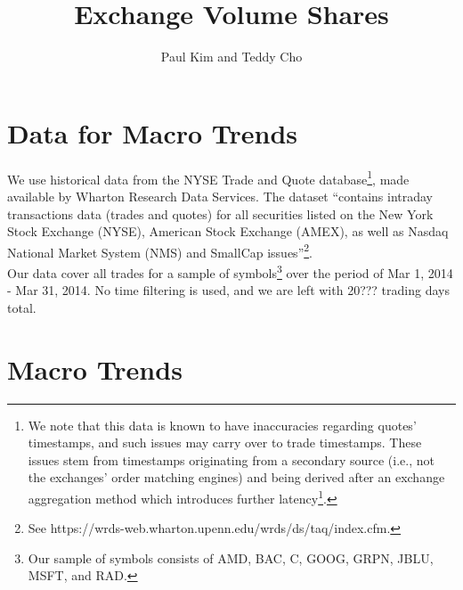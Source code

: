 \documentclass{article}
\begin{document}
\title{Exchange Volume Shares} \author{Paul Kim and Teddy Cho}

\maketitle
\vspace{.5pc}

\section{Data for Macro Trends}
We use historical data from the NYSE Trade and Quote database\footnote{We note that this data is known to have inaccuracies regarding quotes' timestamps, and such issues may carry over to trade timestamps. These issues stem from timestamps originating from a secondary source (i.e., not the exchanges' order matching engines) and being derived after an exchange aggregation method which introduces further latency\footnote{See Budish, Cramton and Shim (2015) and Ding, Hanna and Hendershott (2014)}.}, made available by Wharton Research Data Services. The dataset ``contains intraday transactions data (trades and quotes) for all securities listed on the New York Stock Exchange (NYSE), American Stock Exchange (AMEX), as well as Nasdaq National Market System (NMS) and SmallCap issues''\footnote{See https://wrds-web.wharton.upenn.edu/wrds/ds/taq/index.cfm.}.\\

Our data cover all trades for a sample of symbols\footnote{Our sample of symbols consists of AMD, BAC, C, GOOG, GRPN, JBLU, MSFT, and RAD.} over the period of Mar 1, 2014 - Mar 31, 2014. No time filtering is used, and we are left with 20??? trading days total.\\

\section{Macro Trends}
\end{document}
